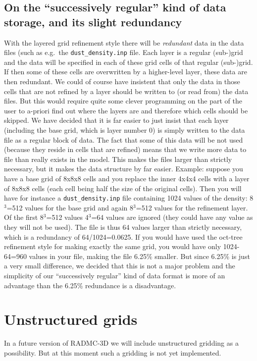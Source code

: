 \documentclass{report}
\begin{document}
\subsection{On the ``successively regular'' kind of data storage, and its slight
  redundancy}
%
\label{sec-layer-amr-redundancy}
With the layered grid refinement style there will be {\em redundant} data in
the data files (such as e.g.\ the {\small\tt dust\_density.inp} file. Each
layer is a regular (sub-)grid and the data will be specified in each of
these grid cells of that regular (sub-)grid.  If then some of these cells
are overwritten by a higher-level layer, these data are then redundant. We
could of course have insistent that only the data in those cells that are
not refined by a layer should be written to (or read from) the data
files. But this would require quite some clever programming on the part of
the user to a-priori find out where the layers are and therefore which cells
should be skipped. We have decided that it is far easier to just insist that
each layer (including the base grid, which is layer number 0) is simply
written to the data file as a regular block of data. The fact that some of
this data will be not used (because they reside in cells that are refined)
means that we write more data to file than really exists in the model. This
makes the files larger than strictly necessary, but it makes the data
structure by far easier. Example: suppose you have a base grid of 8x8x8
cells and you replace the inner 4x4x4 cells with a layer of 8x8x8 cells
(each cell being half the size of the original cells).  Then you will have
for instance a {\small\tt dust\_density.inp} file containing 1024 values of
the density: 8$^3$=512 values for the base grid and again 8$^3$=512 values
for the refinement layer. Of the first 8$^3$=512 values 4$^3$=64 values are
ignored (they could have any value as they will not be used). The file is
thus 64 values larger than strictly necessary, which is a redundancy of
64/1024=0.0625. If you would have used the oct-tree refinement style for
making exactly the same grid, you would have only 1024-64=960 values in your
file, making the file 6.25\% smaller. But since 6.25\% is just a very small
difference, we decided that this is not a major problem and the simplicity
of our ``successively regular'' kind of data format is more of an advantage
than the 6.25\% redundance is a disadvantage.



\section{Unstructured grids}
\label{sec-unstruct-grids}
%
In a future version of RADMC-3D we will include unstructured gridding as a
possibility. But at this moment such a gridding is not yet implemented.
\end{document}
